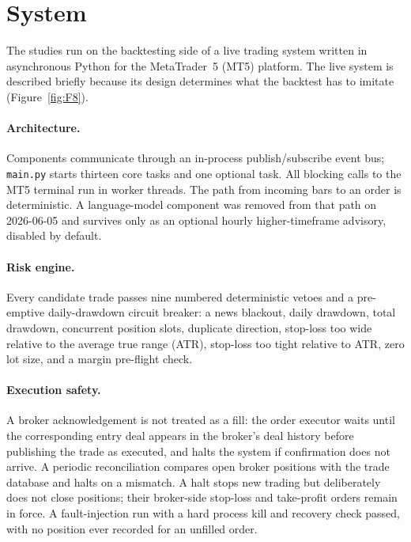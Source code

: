 \documentclass[11pt,a4paper]{article}
\begin{document}
\section{System}
\label{sec:system}

The studies run on the backtesting side of a live trading system written in asynchronous Python
for the MetaTrader~5 (MT5) platform. The live system is described briefly because its design
determines what the backtest has to imitate (Figure~\ref{fig:F8}).

\paragraph{Architecture.}
Components communicate through an in-process publish/subscribe event bus; \texttt{main.py}
starts thirteen core tasks and one optional task. %
All blocking calls to the MT5 terminal run in worker threads. The path from incoming bars to an
order is deterministic. A language-model component was removed from that path on 2026-06-05 and
survives only as an optional hourly higher-timeframe advisory, disabled by default. %

\paragraph{Risk engine.}
Every candidate trade passes nine numbered deterministic vetoes and a pre-emptive daily-drawdown
circuit breaker: a news blackout, daily drawdown, total drawdown, concurrent position slots,
duplicate direction, stop-loss too wide relative to the average true range (ATR), stop-loss too
tight relative to ATR, zero lot size, and a margin pre-flight check. %

\paragraph{Execution safety.}
A broker acknowledgement is not treated as a fill: the order executor waits until the
corresponding entry deal appears in the broker's deal history before publishing the trade as
executed, and halts the system if confirmation does not arrive. %
A periodic reconciliation compares open broker positions with the trade database and halts on a
mismatch. %
A halt stops new trading but deliberately does not close positions; their broker-side stop-loss
and take-profit orders remain in force. %
A fault-injection run with a hard process kill and recovery check passed, with no position ever
recorded for an unfilled order. %
\end{document}
